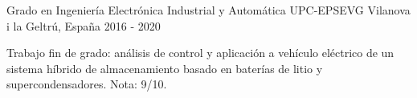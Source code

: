 \cventry
  {Grado en Ingenier\'ia Electr\'onica Industrial y Autom\'atica}
  {UPC-EPSEVG}
  {Vilanova i la Geltr\'u, Espa\~na}
  {2016 - 2020}
  {
    \begin{cvitems}
      \item {Trabajo fin de grado: an\'alisis de control y aplicaci\'on a veh\'iculo el\'ectrico de un sistema h\'ibrido de almacenamiento basado en bater\'ias de litio y supercondensadores. Nota: 9/10.}
    \end{cvitems}
  }

